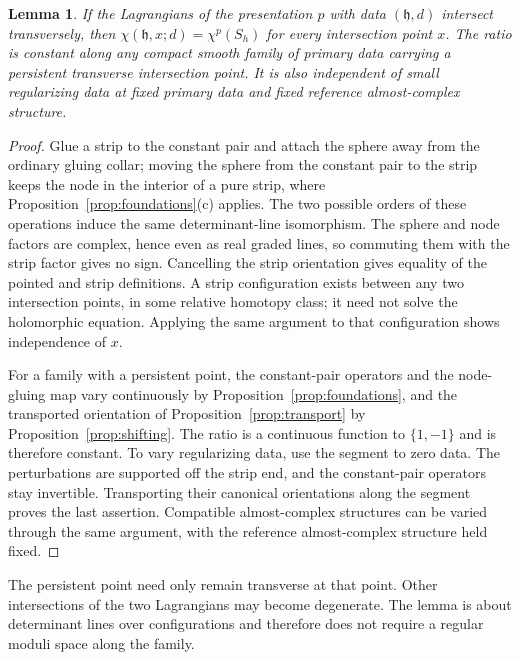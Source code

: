 \documentclass[11pt]{amsart}
\newtheorem{lemma}[theorem]{Lemma}
\theoremstyle{definition}
\theoremstyle{remark}
\theoremstyle{plain}
\numberwithin{equation}{section}
\begin{document}
\begin{lemma}\label{lem:pointed-character}
If the Lagrangians of the presentation $p$ with data $(\mathfrak h,d)$ intersect transversely, then $\chi(\mathfrak h,x;d)=\chi^p(S_h)$ for every
intersection point $x$. The ratio is constant along
any compact smooth family of primary data carrying
a persistent transverse intersection point. It is
also independent of small regularizing data at
fixed primary data and fixed reference
almost-complex structure.
\end{lemma}
\begin{proof}
Glue a strip to the constant pair and attach the
sphere away from the ordinary gluing collar; moving
the sphere from the constant pair to the strip keeps
the node in the interior of a pure strip, where
Proposition~\ref{prop:foundations}(c) applies. The
two possible orders of these operations induce
the same determinant-line isomorphism. The sphere
and node factors are complex, hence even as real
graded lines, so commuting them with the strip
factor gives no sign. Cancelling the strip
orientation gives equality of the pointed and
strip definitions. A strip configuration exists
between any two intersection points, in some
relative homotopy class; it need not solve the
holomorphic equation. Applying the same argument
to that configuration shows independence of $x$.

For a family with a persistent point, the
constant-pair operators and the node-gluing map vary
continuously by Proposition~\ref{prop:foundations}, and the
transported orientation of Proposition~\ref{prop:transport} by
Proposition~\ref{prop:shifting}.
The ratio is a continuous function to
$\{1,-1\}$ and is therefore constant. To vary
regularizing data, use the segment to zero data.
The perturbations are supported off the strip
end, and the constant-pair operators stay
invertible. Transporting their canonical
orientations along the segment proves the last
assertion. Compatible almost-complex structures
can be varied through the same argument, with
the reference almost-complex structure held fixed.
\end{proof}

The persistent point need only remain transverse
at that point. Other intersections of the two
Lagrangians may become degenerate. The lemma is
about determinant lines over configurations and
therefore does not require a regular moduli
space along the family.
\end{document}
